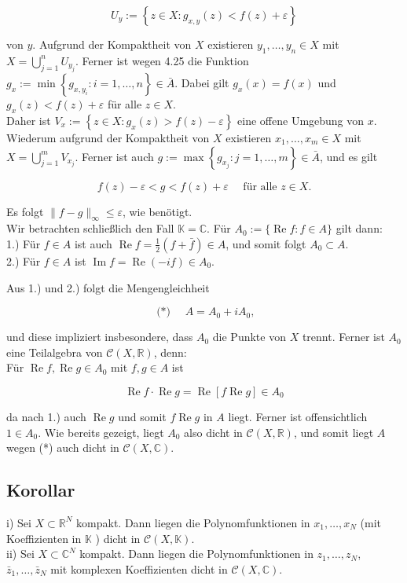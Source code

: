 \documentclass[10pt, letterpaper]{article}
\begin{document}
$$
U_{y}:=\left\{z \in X: g_{x, y}(z)<f(z)+\varepsilon\right\}
$$

von $y$. Aufgrund der Kompaktheit von $X$ existieren $y_{1}, \ldots, y_{n} \in X$ mit $X=\bigcup_{j=1}^{n} U_{y_{j}}$. Ferner ist wegen 4.25 die Funktion $g_{x}:=\min \left\{g_{x, y_{i}}: i=1, \ldots, n\right\} \in \bar{A}$. Dabei gilt $g_{x}(x)=f(x)$ und $g_{x}(z)<f(z)+\varepsilon$ für alle $z \in X$.\\
Daher ist $V_{x}:=\left\{z \in X: g_{x}(z)>f(z)-\varepsilon\right\}$ eine offene Umgebung von $x$. Wiederum aufgrund der Kompaktheit von $X$ existieren $x_{1}, \ldots, x_{m} \in X$ mit $X=\bigcup_{j=1}^{m} V_{x_{j}}$. Ferner ist auch $g:=\max \left\{g_{x_{j}}: j=1, \ldots, m\right\} \in \bar{A}$, und es gilt

$$
f(z)-\varepsilon<g<f(z)+\varepsilon \quad \text { für alle } z \in X .
$$

Es folgt $\|f-g\|_{\infty} \leq \varepsilon$, wie benötigt.\\
Wir betrachten schließlich den Fall $\mathbb{K}=\mathbb{C}$. Für $A_{0}:=\{\operatorname{Re} f: f \in A\}$ gilt dann:\\
1.) Für $f \in A$ ist auch $\operatorname{Re} f=\frac{1}{2}(f+\bar{f}) \in A$, und somit folgt $A_{0} \subset A$.\\
2.) Für $f \in A$ ist $\operatorname{Im} f=\operatorname{Re}(-i f) \in A_{0}$.

Aus 1.) und 2.) folgt die Mengengleichheit

$$
\text { (*) } \quad A=A_{0}+i A_{0},
$$

und diese impliziert insbesondere, dass $A_{0}$ die Punkte von $X$ trennt. Ferner ist $A_{0}$ eine Teilalgebra von $\mathcal{C}(X, \mathbb{R})$, denn:\\
Für $\operatorname{Re} f, \operatorname{Re} g \in A_{0}$ mit $f, g \in A$ ist

$$
\operatorname{Re} f \cdot \operatorname{Re} g=\operatorname{Re}[f \operatorname{Re} g] \in A_{0}
$$

da nach 1.) auch $\operatorname{Re} g$ und somit $f \operatorname{Re} g$ in $A$ liegt. Ferner ist offensichtlich $1 \in A_{0}$. Wie bereits gezeigt, liegt $A_{0}$ also dicht in $\mathcal{C}(X, \mathbb{R})$, und somit liegt $A$ wegen (*) auch dicht in $\mathcal{C}(X, \mathbb{C})$.

\subsection*{Korollar}
i) Sei $X \subset \mathbb{R}^{N}$ kompakt. Dann liegen die Polynomfunktionen in $x_{1}, \ldots, x_{N}$ (mit Koeffizienten in $\mathbb{K}$ ) dicht in $\mathcal{C}(X, \mathbb{K})$.\\
ii) Sei $X \subset \mathbb{C}^{N}$ kompakt. Dann liegen die Polynomfunktionen in $z_{1}, \ldots, z_{N}$, $\bar{z}_{1}, \ldots, \bar{z}_{N}$ mit komplexen Koeffizienten dicht in $\mathcal{C}(X, \mathbb{C})$.
\end{document}
